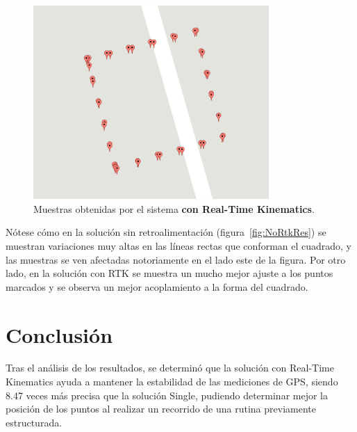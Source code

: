 \begin{figure}[H]
\centering
\includegraphics[width=0.8\textwidth]{Figures/RtkRes}
\caption[Muestras obtenidas por el sistema con Real-Time Kinematics.]{Muestras obtenidas por el sistema \textbf{con Real-Time Kinematics}.}
\label{fig:RtkRes}
\end{figure}

Nótese cómo en la solución sin retroalimentación (figura~\ref{fig:NoRtkRes}) se muestran variaciones muy altas en las líneas rectas que conforman el cuadrado, y las muestras se ven afectadas notoriamente en el lado este de la figura. Por otro lado, en la solución con RTK se muestra un mucho mejor ajuste a los puntos marcados y se observa un mejor acoplamiento a la forma del cuadrado.

\section{Conclusión}
Tras el análisis de los resultados, se determinó que la solución con Real-Time Kinematics ayuda a mantener la estabilidad de las mediciones de GPS, siendo 8.47 veces más precisa que la solución Single, pudiendo determinar mejor la posición de los puntos al realizar un recorrido de una rutina previamente estructurada.